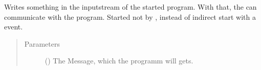 \documentclass[letterpaper,10pt,english]{sphinxmanual}
\begin{document}
\begin{fulllineitems}

\begin{fulllineitems}
\label{\detokenize{anoog.automation:anoog.automation.py_exe_interface.Process_Interface.write}}
\sphinxAtStartPar
Writes something in the inputstream of the started program.
With that, the {\hyperref[\detokenize{anoog.automation:anoog.automation.controller.Terminal}]{}} can communicate with the program.
Started not by {\hyperref[\detokenize{anoog.automation:anoog.automation.controller.Terminal}]{}}, instead of indirect start with a event.
\begin{quote}\begin{description}
\item[{Parameters}] \leavevmode
\sphinxAtStartPar
{} () \textendash{} The Message, which the programm will gets.

\end{description}\end{quote}

\end{fulllineitems}


\end{fulllineitems}

\end{document}
